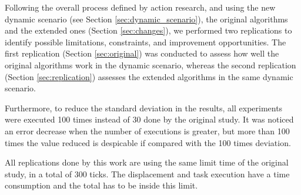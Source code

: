 Following the overall process defined by action research, and using the new dynamic scenario (see Section \ref{sec:dynamic_scenario}), the original algorithms and the extended ones (Section \ref{sec:changes}), we performed two replications to identify possible limitations, constraints, and improvement opportunities. The first replication (Section \ref{sec:original}) was conducted to assess how well the original algorithms work in the dynamic scenario, whereas the second replication (Section \ref{sec:replication}) assesses the extended algorithms in the same dynamic scenario.

Furthermore, to reduce the standard deviation in the results, all experiments were executed 100 times instead of 30 done by the original study. It was noticed an error decrease when the number of executions is greater, but more than 100 times the value reduced is despicable if compared with the 100 times deviation.

All replications done by this work are using the same limit time of the original study, in a total of 300 ticks. The displacement and task execution have a time consumption and the total has to be inside this limit.

